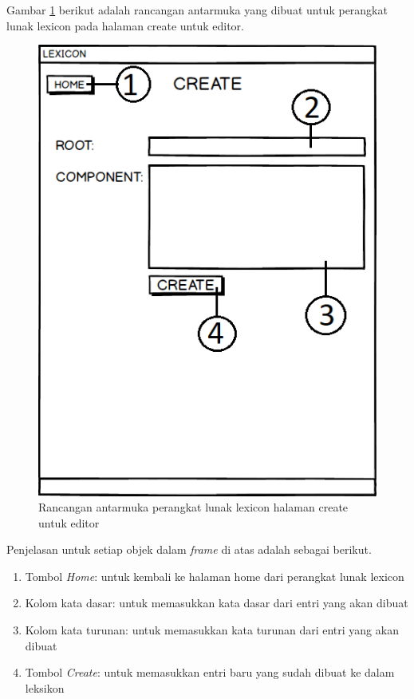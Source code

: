 Gambar \ref{mockup-lexicon-create-editor} berikut adalah rancangan antarmuka yang dibuat untuk perangkat lunak lexicon pada halaman create untuk editor.

\begin{figure}[H]
\centering
\includegraphics[scale=0.8]{Gambar/mockup-lexicon-create-editor}
\caption{Rancangan antarmuka perangkat lunak lexicon halaman create untuk editor} 
\label{mockup-lexicon-create-editor}
\end{figure}

Penjelasan untuk setiap objek dalam \textit{frame} di atas adalah sebagai berikut.

\begin{enumerate}
	\item Tombol \textit{Home}: untuk kembali ke halaman home dari perangkat lunak lexicon
	\item Kolom kata dasar: untuk memasukkan kata dasar dari entri yang akan dibuat
	\item Kolom kata turunan: untuk memasukkan kata turunan dari entri yang akan dibuat
	\item Tombol \textit{Create}: untuk memasukkan entri baru yang sudah dibuat ke dalam leksikon
\end{enumerate}


